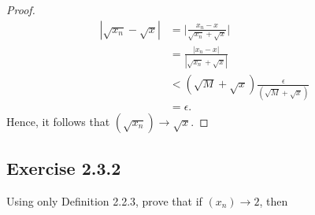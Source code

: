 \begin{enumerate}
\begin{proof}
        \begin{align*}
        |  \sqrt{x_n } - \sqrt{x}  | &= \Big| \frac{ x_n - x}{ \sqrt{x_n} + \sqrt{x}} \Big| \\
                          &= \frac{ | x_n - x |}{ |\sqrt{x_n} + \sqrt{x} | } \\
                          &< ( \sqrt{M} + \sqrt{x}) \frac{ \epsilon }{ (\sqrt{M} + \sqrt{x})} \\ 
                          &= \epsilon. 
        \end{align*}
        Hence, it follows that \( ( \sqrt{x_n}) \to \sqrt{x}\).
        \end{proof}
\end{enumerate}

\subsection{Exercise 2.3.2}
Using only Definition 2.2.3, prove that if \( (x_n) \to 2\), then 
